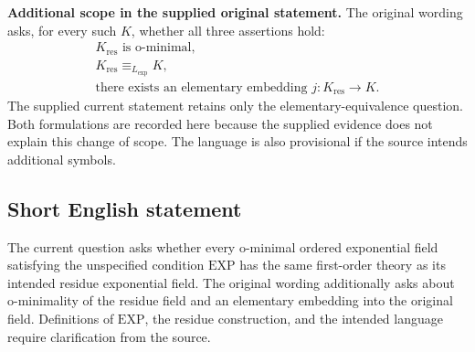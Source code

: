 \documentclass[11pt]{article}
\begin{document}
\textbf{Additional scope in the supplied original statement.} The original wording asks, for every such \(K\), whether all three assertions hold:
\[
\begin{gathered}
K_{\mathrm{res}}\text{ is o-minimal},\\
K_{\mathrm{res}}\equiv_{L_{\exp}}K,\\
\text{there exists an elementary embedding }j:K_{\mathrm{res}}\to K.
\end{gathered}
\]
The supplied current statement retains only the elementary-equivalence question. Both formulations are recorded here because the supplied evidence does not explain this change of scope. The language is also provisional if the source intends additional symbols.
\subsection{Short English statement}
The current question asks whether every o-minimal ordered exponential field satisfying the unspecified condition \(\mathrm{EXP}\) has the same first-order theory as its intended residue exponential field. The original wording additionally asks about o-minimality of the residue field and an elementary embedding into the original field. Definitions of \(\mathrm{EXP}\), the residue construction, and the intended language require clarification from the source.
\end{document}
